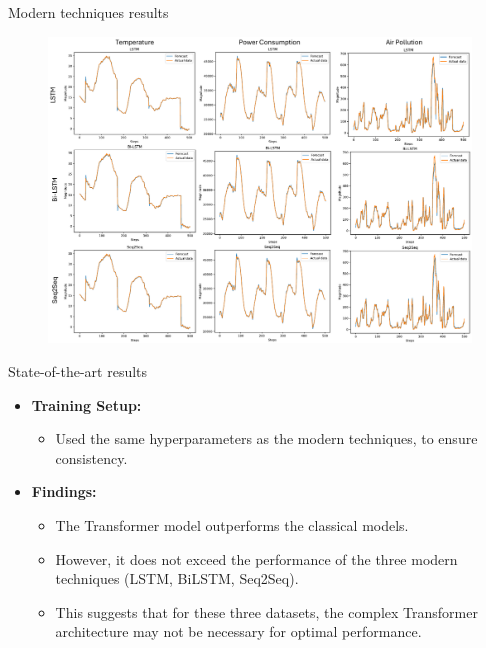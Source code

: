 \documentclass[aspectratio=16 9,10pt]{beamer}
\begin{document}
\begin{frame}{Modern techniques results}
\begin{figure}[]
	\begin{center}
	\includegraphics[width=1\textwidth, height=0.8\textheight, keepaspectratio]{modern.pdf}
	\end{center}
\end{figure}
\end{frame}


\begin{frame}{State-of-the-art results}
    \begin{itemize}
        \item \textbf{Training Setup:}
        \begin{itemize}
            \item Used the same hyperparameters as the modern techniques, to ensure consistency.
        \end{itemize}

        \item \textbf{Findings:}
        \begin{itemize}
            \item The Transformer model outperforms the classical models.
            \item However, it does not exceed the performance of the three modern techniques (LSTM, BiLSTM, Seq2Seq).
            \item This suggests that for these three datasets, the complex Transformer architecture may not be necessary for optimal performance.
        \end{itemize}
    \end{itemize}
\end{frame}
\end{document}
